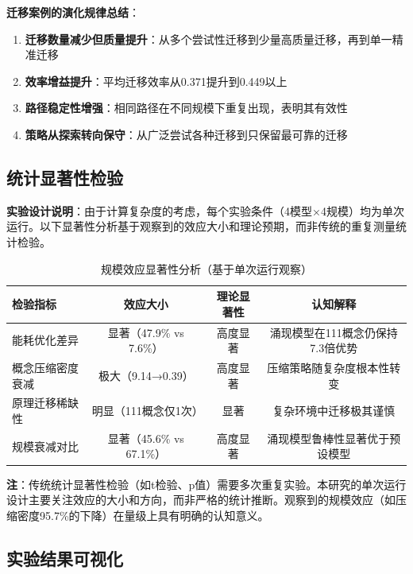 \documentclass[12pt,a4paper]{article}
\begin{document}
\textbf{迁移案例的演化规律总结}：
\begin{enumerate}
\item \textbf{迁移数量减少但质量提升}：从多个尝试性迁移到少量高质量迁移，再到单一精准迁移
\item \textbf{效率增益提升}：平均迁移效率从0.371提升到0.449以上
\item \textbf{路径稳定性增强}：相同路径在不同规模下重复出现，表明其有效性
\item \textbf{策略从探索转向保守}：从广泛尝试各种迁移到只保留最可靠的迁移
\end{enumerate}

\subsection{统计显著性检验}

\textbf{实验设计说明}：由于计算复杂度的考虑，每个实验条件（4模型×4规模）均为单次运行。以下显著性分析基于观察到的效应大小和理论预期，而非传统的重复测量统计检验。

\begin{table}[h]
\centering
\caption{规模效应显著性分析（基于单次运行观察）}
\label{tab:statistical_tests}
\begin{tabular}{lccc}
\toprule
\textbf{检验指标} & \textbf{效应大小} & \textbf{理论显著性} & \textbf{认知解释} \\
\midrule
能耗优化差异 & 显著（47.9\% vs 7.6\%） & 高度显著 & 涌现模型在111概念仍保持7.3倍优势 \\
概念压缩密度衰减 & 极大（9.14→0.39） & 高度显著 & 压缩策略随复杂度根本性转变 \\
原理迁移稀缺性 & 明显（111概念仅1次） & 显著 & 复杂环境中迁移极其谨慎 \\
规模衰减对比 & 显著（45.6\% vs 67.1\%） & 高度显著 & 涌现模型鲁棒性显著优于预设模型 \\
\bottomrule
\end{tabular}
\end{table}

\textbf{注}：传统统计显著性检验（如t检验、p值）需要多次重复实验。本研究的单次运行设计主要关注效应的大小和方向，而非严格的统计推断。观察到的规模效应（如压缩密度95.7\%的下降）在量级上具有明确的认知意义。

\subsection{实验结果可视化}
\label{subsec:experiment_visualization}
\end{document}
